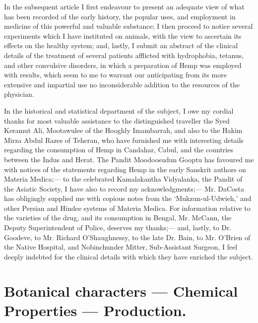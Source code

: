 \documentclass[a4paper, 11pt, oneside, polutonikogreek, english]{article}
\begin{document}
In the subsequent article I first endeavour to present an adequate view of what has been recorded of the early history, the popular uses, and employment in medicine of this powerful and valuable substance; I then proceed to notice several experiments which I have instituted on animals, with the view to ascertain its effects on the healthy system; and, lastly, I submit an abstract of the clinical details of the treatment of several patients afflicted with hydrophobia, tetanus, and other convulsive disorders, in which a preparation of Hemp was employed with results, which seem to me to warrant our anticipating from its more extensive and impartial use no inconsiderable addition to the resources of the physician.

In the historical and statistical department of the subject, I owe my cordial thanks for most valuable assistance to the distinguished traveller the Syed Keramut Ali, Mootawulee of the Hooghly Imambarrah, and also to the Hakim Mirza Abdul Razes of Teheran, who have furnished me with interesting details regarding the consumption of Hemp in Candahar, Cabul, and the countries between the Indus and Herat. The Pandit Moodoosudun Gooptu has favoured me with notices of the statements regarding Hemp in the early Sanskrit authors on Materia Medica;--- to the celebrated Kamalakantha Vidyalanka, the Pandit of the Asiatic Society, I have also to record my acknowledgments;--- Mr. DaCosta has obligingly supplied me with copious notes from the `Mukzun-ul-Udwieh,' and other Persian and Hindee systems of Materia Medica. For information relative to the varieties of the drug, and its consumption in Bengal, Mr. McCann, the Deputy Superintendent of Police, deserves my thanks;--- and, lastly, to Dr. Goodeve, to Mr. Richard O'Shaughnessy, to the late Dr. Bain, to Mr. O'Brien of the Native Hospital, and Nobinchunder Mitter, Sub-Assistant Surgeon, I feel deeply indebted for the clinical details with which they have enriched the subject.
\clearpage
\section{Botanical characters --- Chemical Properties --- Production.}
\end{document}
